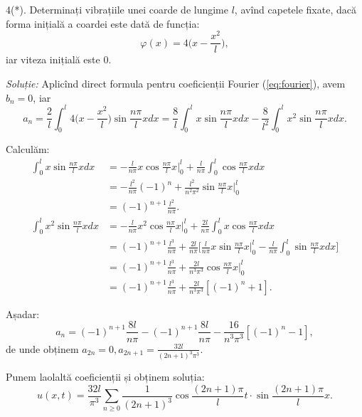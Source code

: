 \documentclass[11pt,a4paper]{article}
\theoremstyle{dotless}
\theoremstyle{dotlessdr}
\begin{document}
\vspace{1cm}

4(*). Determinați vibrațiile unei coarde de lungime $ l $, avînd capetele fixate,
dacă forma inițială a coardei este dată de funcția:
\[
  \varphi(x) = 4 \Big( x - \frac{x^2}{l} \Big),
\]
iar viteza inițială este $ 0 $.

\vspace{1cm}

\emph{Soluție:} Aplicînd direct formula pentru coeficienții Fourier (\ref{eq:fourier}),
avem $ b_n = 0 $, iar
\[
  a_n = \frac{2}{l} \int_0^l 4\Big( x - \frac{x^2}{l} \Big) \sin \frac{n\pi}{l} xdx = %
  \frac{8}{l} \int_0^l x \sin \frac{n\pi}{l} xdx - %
  \frac{8}{l^2} \int_0^l x^2 \sin \frac{n\pi}{l}xdx.
\]

Calculăm:
\begin{align*}
  \int_0^l x\sin \frac{n\pi}{l} xdx &= -\frac{l}{n\pi} x \cos \frac{n\pi}{l}x \Big|_0^l + %
                                      \frac{l}{n\pi} \int_0^l \cos \frac{n\pi}{l} xdx \\
                                    &= -\frac{l^2}{n\pi}(-1)^n + %
                                      \frac{l^2}{n^2 \pi^2} \sin\frac{n\pi}{l} x\Big|_0^l \\
                                    &= (-1)^{n + 1} \frac{l^2}{n\pi}. \\
  \int_0^l x^2 \sin \frac{n\pi}{l} xdx &= -\frac{l}{n\pi}x^2 \cos \frac{n\pi}{l}x \Big|_0^l + %
                                         \frac{2l}{n\pi}\int_0^l x\cos \frac{n\pi}{l} xdx \\
                                    &= (-1)^{n + 1} \frac{l^3}{n\pi} + %
                                      \frac{2l}{n\pi}\Big[ \frac{l}{n\pi} x\sin \frac{n\pi}{l}x\Big|_0^l - \frac{l}{n\pi}\int_0^l \sin \frac{n\pi}{l}xdx \Big] \\
                                    &= (-1)^{n + 1}\frac{l^3}{n\pi} + %
                                      \frac{2l}{n^3 \pi^3}\cos \frac{n\pi}{l}x\Big|_0^l \\
                                    &= (-1)^{n + 1} \frac{l^3}{n\pi} + \frac{2l}{n^3 \pi^3}[(-1)^n + 1].
\end{align*}

Așadar:
\[
  a_n = (-1)^{n + 1} \frac{8l}{n\pi} - (-1)^{n + 1}\frac{8l}{n\pi} - %
  \frac{16}{n^3 \pi^3}[(-1)^n - 1],
\]
de unde obținem $ a_{2n} = 0, a_{2n+1} = \frac{32l}{(2n + 1)^3 \pi^3} $.

Punem laolaltă coeficienții și obținem soluția:
\[
  u(x, t) = \frac{32l}{\pi^3} \sum_{n \geq 0} \frac{1}{(2n + 1)^3} \cos\frac{(2n + 1)\pi}{l} t %
  \cdot \sin\frac{(2n + 1)\pi}{l} x.
\]
\end{document}
